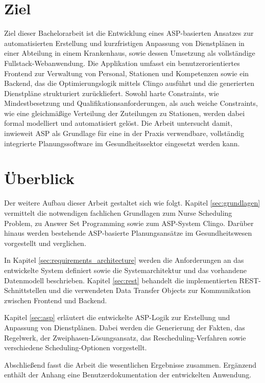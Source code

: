 \section{Ziel}
\label{sec:introduction:objectives}
Ziel dieser Bachelorarbeit ist die Entwicklung eines ASP-basierten Ansatzes zur automatisierten Erstellung und kurzfristigen Anpassung von Dienstplänen in einer Abteilung in einem Krankenhaus, sowie dessen Umsetzung als vollständige Fullstack-Webanwendung. Die Applikation umfasst ein benutzerorientiertes Frontend zur Verwaltung von Personal, Stationen und Kompetenzen sowie ein Backend, das die Optimierungslogik mittels Clingo ausführt und die generierten Dienstpläne strukturiert zurückliefert. Sowohl harte Constraints, wie Mindestbesetzung und Qualifikationsanforderungen, als auch weiche Constraints, wie eine gleichmäßige Verteilung der Zuteilungen zu Stationen, werden dabei formal modelliert und automatisiert gelöst. Die Arbeit untersucht damit, inwieweit ASP als Grundlage für eine in der Praxis verwendbare, vollständig integrierte Planungssoftware im Gesundheitssektor eingesetzt werden kann.

\section{Überblick}
Der weitere Aufbau dieser Arbeit gestaltet sich wie folgt. Kapitel \ref{sec:grundlagen} vermittelt die notwendigen fachlichen Grundlagen zum Nurse Scheduling Problem, zu Answer Set Programming sowie zum ASP-System Clingo. Darüber hinaus werden bestehende ASP-basierte Planungsansätze im Gesundheitswesen vorgestellt und verglichen.

In Kapitel \ref{sec:requirements_architecture} werden die Anforderungen an das entwickelte System definiert sowie die Systemarchitektur und das vorhandene Datenmodell beschrieben. Kapitel \ref{sec:rest} behandelt die implementierten REST-Schnittstellen und die verwendeten Data Transfer Objects zur Kommunikation zwischen Frontend und Backend.

Kapitel \ref{sec:asp} erläutert die entwickelte ASP-Logik zur Erstellung und Anpassung von Dienstplänen. Dabei werden die Generierung der Fakten, das Regelwerk, der Zweiphasen-Lösungsansatz, das Rescheduling-Verfahren sowie verschiedene Scheduling-Optionen vorgestellt.

Abschließend fasst die Arbeit die wesentlichen Ergebnisse zusammen. Ergänzend enthält der Anhang eine Benutzerdokumentation der entwickelten Anwendung.






